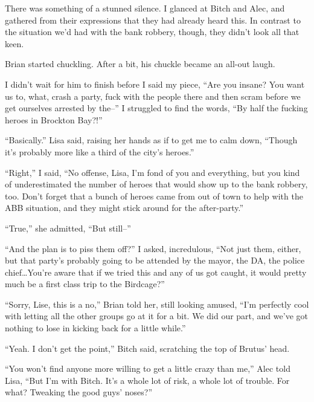 There was something of a stunned silence.  I glanced at Bitch and Alec, and gathered from their expressions that they had already heard this.  In contrast to the situation we'd had with the bank robbery, though, they didn't look all that keen.



Brian started chuckling.  After a bit, his chuckle became an all-out laugh.



I didn't wait for him to finish before I said my piece, ``Are you insane?  You want us to, what, crash a party, fuck with the people there and then scram before we get ourselves arrested by the--'' I struggled to find the words, ``By half the fucking heroes in Brockton Bay?!''



``Basically.''  Lisa said, raising her hands as if to get me to calm down, ``Though it's probably more like a third of the city's heroes.''



``Right,'' I said, ``No offense, Lisa, I'm fond of you and everything, but you kind of underestimated the number of heroes that would show up to the bank robbery, too.  Don't forget that a bunch of heroes came from out of town to help with the ABB situation, and they might stick around for the after-party.''



``True,'' she admitted, ``But still--''



``And the plan is to piss them off?'' I asked, incredulous, ``Not just them, either, but that party's probably going to be attended by the mayor, the DA, the police chief\ldots You're aware that if we tried this and any of us got caught, it would pretty much be a first class trip to the Birdcage?''



``Sorry, Lise, this is a no,'' Brian told her, still looking amused, ``I'm perfectly cool with letting all the other groups go at it for a bit.  We did our part, and we've got nothing to lose in kicking back for a little while.''



``Yeah.  I don't get the point,'' Bitch said, scratching the top of Brutus' head.



``You won't find anyone more willing to get a little crazy than me,'' Alec told Lisa, ``But I'm with Bitch.  It's a whole lot of risk, a whole lot of trouble.  For what?  Tweaking the good guys' noses?''



